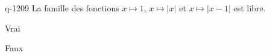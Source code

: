 \begin{truefalse}{q-1209}
La famille des fonctions $x\mapsto 1$, $x\mapsto |x|$ et $x\mapsto |x-1|$ est libre.
\item* Vrai
\item Faux
\end{truefalse}

